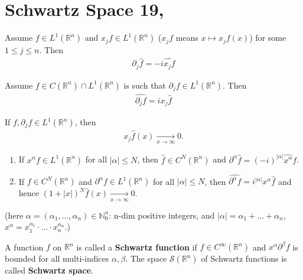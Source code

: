 \section{Schwartz Space \tiny{19, \cite{schilling2017measures}}}
\begin{proposition}
    Assume \(f\in L^1(\mathbb{R}^n)\) and \(x_j f\in L^{1}(\mathbb{R}^n)\) (\(x_j f\) means \(x\mapsto x_j f(x)\)) for some \(1\leq j\leq n\). Then 
    \begin{align*}
        \partial_j \hat{f} = -i\widehat{x_j f}
    \end{align*}
\end{proposition}
\begin{proposition}
    Assume \(f\in C(\mathbb{R}^n)\cap L^{1}(\mathbb{R}^n)\) is such that \(\partial_j f\in L^{1}(\mathbb{R}^n)\). Then 
    \begin{align*}
        \widehat{\partial_j f} = i x_j \hat{f}
    \end{align*}
\end{proposition}
\begin{corollary}
    If \(f,\partial_j f\in L^{1}(\mathbb{R}^n)\), then 
    \begin{align*}
        x_j \hat{f}(x) \xrightarrow[x\rightarrow\infty]{ } 0.
    \end{align*}
\end{corollary}
\begin{corollary}
    \begin{enumerate}
        \item If \(x^{\alpha}f\in L^{1}(\mathbb{R}^n)\) for all \(|\alpha|\leq N\), then \(\hat{f}\in C^N(\mathbb{R}^n)\) and \(\partial^{\alpha}\hat{f} = (-i)^{|\alpha|} \widehat{x^{\alpha }}f\).
        \item If \(f\in C^N(\mathbb{R}^n)\) and \(\partial^{\alpha}f\in L^1(\mathbb{R}^n)\) for all \(|\alpha|\leq N\), then \(\widehat{\partial^{\alpha} f} = i^{|\alpha|}x^{\alpha}\hat{f}\) and hence \((1 + |x|)^N \hat{f}(x)\xrightarrow[x\rightarrow\infty]{ } 0.\)
    \end{enumerate}
    (here \(\alpha = (\alpha_1, ..., \alpha_n)\in \mathbb{N}_{0}^{n}\): n-dim positive integers, and \(|\alpha|= \alpha_1 + ...+ \alpha_n\), \(x^{\alpha} = x_{1}^{\alpha_1}\cdot ...\cdot x_{n}^{\alpha_n}\).)
\end{corollary}
\begin{definition}
    A function \(f\) on \(\mathbb{R}^n\) is called a \textbf{Schwartz function} if \(f\in C^{\infty}(\mathbb{R}^n)\) and \(x^{\alpha}\partial^{\beta}f\) is bounded for all multi-indices \(\alpha,\beta\). The space \(\mathcal{S}(\mathbb{R}^n)\) of Schwartz functions is called \textbf{Schwartz space}. 
\end{definition}

